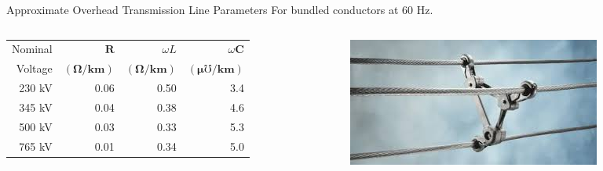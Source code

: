 \begin{frame}{Approximate Overhead Transmission Line Parameters}
For bundled conductors at 60 Hz.

\begin{columns}
    \begin{column}{0.55\textwidth}
\begin{table}
\begin{tabular}{rrrr}
\hline Nominal  & $\boldsymbol{R}$ & $\omega L$& $\omega \boldsymbol{C}$ \\
Voltage & $(\boldsymbol{\Omega} / \mathbf{k m})$ & $(\boldsymbol{\Omega} / \mathbf{k m})$ & $ (\boldsymbol{\mu} \boldsymbol{\mho} / \mathbf{k m})$ \\
\hline 230 kV & 0.06 & 0.50 & 3.4 \\
345 kV & 0.04 & 0.38 & 4.6 \\
500 kV & 0.03 & 0.33 & 5.3 \\
765 kV & 0.01 & 0.34 & 5.0 \\
\hline
\end{tabular}
\end{table}
    \end{column}
    \begin{column}{0.4\textwidth}
    \includegraphics[width=\textwidth]{images/bundled_conductors.jpeg}
    \end{column}
\end{columns}
\end{frame}

